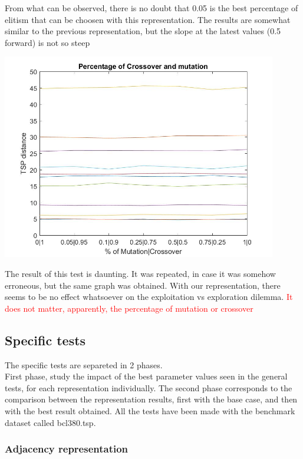 From what can be observed, there is no doubt that 0.05 is the best
percentage of elitism that can be choosen with this representation. The results
are somewhat similar to the previous representation, but the slope at the
latest values (0.5 forward) is not so steep

\begin{center}
\includegraphics[width=12cm]{img/order_crossover/crossMut.jpg}
\end{center}

The result of this test is daunting. It was repeated, in case it was somehow
erroneous, but the same graph was obtained. With our representation, there
seems to be no effect whatsoever on the exploitation vs exploration dilemma.
\textcolor{red}{It does not matter, apparently, the percentage of mutation
or crossover}
\\


\subsection{Specific tests}

The specific tests are separeted in 2 phases.\\
 First phase, study the impact of the best parameter values seen in the general
tests, for each representation individually. The second phase
corresponds to the comparison between the representation results, first with the
base case, and then with the best result obtained.
All the tests have been made with the benchmark dataset called bcl380.tsp.

\subsubsection{Adjacency representation}

